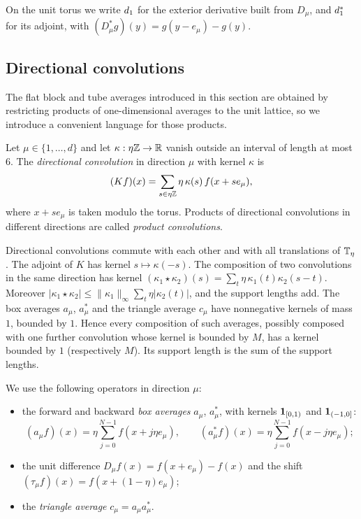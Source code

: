 On the unit torus we write $d_1$ for the exterior derivative built from $D_\mu$, and $d_1^*$ for its adjoint, with $(D_\mu^*g)(y)=g(y-e_\mu)-g(y)$.

\subsection{Directional convolutions}

The flat block and tube averages introduced in this section are obtained by restricting products of one-dimensional averages to the unit lattice, so we introduce a convenient language for those products.

\begin{definition}
Let $\mu\in\{1,\dots,d\}$ and let $\kappa:\eta\mathbb Z\to\mathbb R$ vanish outside an interval of length at most $6$. The \emph{directional convolution} in direction $\mu$ with kernel $\kappa$ is
\[
(Kf)(x)=\sum_{s\in\eta\mathbb Z}\eta\,\kappa(s)\,f(x+se_\mu),
\]
where $x+se_\mu$ is taken modulo the torus. Products of directional convolutions in different directions are called \emph{product convolutions}.
\end{definition}

Directional convolutions commute with each other and with all translations of $\mathbb T_\eta$. The adjoint of $K$ has kernel $s\mapsto\kappa(-s)$. The composition of two convolutions in the same direction has kernel $(\kappa_1\star\kappa_2)(s)=\sum_t\eta\,\kappa_1(t)\kappa_2(s-t)$. Moreover $|\kappa_1\star\kappa_2|\le\|\kappa_1\|_\infty\sum_t\eta|\kappa_2(t)|$, and the support lengths add. The box averages $a_\mu$, $a^*_\mu$ and the triangle average $c_\mu$ have nonnegative kernels of mass $1$, bounded by $1$. Hence every composition of such averages, possibly composed with one further convolution whose kernel is bounded by $M$, has a kernel bounded by $1$ (respectively $M$). Its support length is the sum of the support lengths.

We use the following operators in direction $\mu$:
\begin{itemize}
\item the forward and backward \emph{box averages} $a_\mu$, $a_\mu^*$, with kernels $\mathbf 1_{[0,1)}$ and $\mathbf 1_{(-1,0]}$:
\[
(a_\mu f)(x)=\eta\sum_{j=0}^{N-1}f(x+j\eta e_\mu),\qquad (a_\mu^*f)(x)=\eta\sum_{j=0}^{N-1}f(x-j\eta e_\mu);
\]
\item the unit difference $D_\mu f(x)=f(x+e_\mu)-f(x)$ and the shift $(\tau_\mu f)(x)=f(x+(1-\eta)e_\mu)$;
\item the \emph{triangle average} $c_\mu=a_\mu a_\mu^*$.
\end{itemize}

